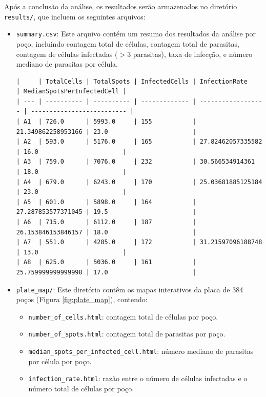 \documentclass{article}
\begin{document}
Após a conclusão da análise, os resultados serão armazenados no diretório \texttt{results/}, que incluem os seguintes arquivos:

\begin{itemize}
  \item \texttt{summary.csv}: Este arquivo contém um resumo dos resultados da análise por poço, incluindo contagem total de células, contagem total de parasitas, contagem de células infectadas ($>3$ parasitas), taxa de infecção, e número mediano de parasitas por célula.

\begin{verbatim}
|     | TotalCells | TotalSpots | InfectedCells | InfectionRate      | MedianSpotsPerInfectedCell |
| --- | ---------- | ---------- | ------------- | ------------------ | -------------------------- |
| A1  | 726.0      | 5993.0     | 155           | 21.349862258953166 | 23.0                       |
| A2  | 593.0      | 5176.0     | 165           | 27.82462057335582  | 16.0                       |
| A3  | 759.0      | 7076.0     | 232           | 30.566534914361    | 18.0                       |
| A4  | 679.0      | 6243.0     | 170           | 25.03681885125184  | 23.0                       |
| A5  | 601.0      | 5898.0     | 164           | 27.287853577371045 | 19.5                       |
| A6  | 715.0      | 6112.0     | 187           | 26.153846153846157 | 18.0                       |
| A7  | 551.0      | 4285.0     | 172           | 31.21597096188748  | 13.0                       |
| A8  | 625.0      | 5036.0     | 161           | 25.759999999999998 | 17.0                       |
\end{verbatim}
  
  \item \texttt{plate\_map/}: Este diretório contêm os mapas interativos da placa de 384 poços (Figura \ref{fig:plate_map}), contendo:

  \begin{itemize}
    \item \texttt{number\_of\_cells.html}: contagem total de células por poço.
    \item \texttt{number\_of\_spots.html}: contagem total de parasitas por poço.
    \item \texttt{median\_spots\_per\_infected\_cell.html}: número mediano de parasitas por célula por poço.
    \item \texttt{infection\_rate.html}: razão entre o número de células infectadas e o número total de células por poço.
  \end{itemize}


\end{itemize}
\end{document}
